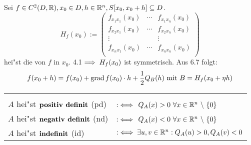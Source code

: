 \documentclass[a4paper,twoside,DIV15,BCOR12mm,chapterprefix=true,headings=twolinechapter]{scrbook}
\begin{document}
\begin{beispiel}
Sei $f\in C^2(D,\mathbb{R}),x_0\in D, h\in \mathbb{R}^n, S[x_0,x_0+h]\subseteq D$.
$$H_f(x_0):=\begin{pmatrix}
f_{x_1x_1}(x_0)&\cdots&f_{x_1x_n}(x_0)\\
f_{x_2x_1}(x_0)&\cdots&f_{x_2x_n}(x_0)\\
\vdots& &\vdots\\
f_{x_nx_1}(x_0)&\cdots&f_{x_nx_n}(x_0)\\
\end{pmatrix}$$
hei"st die  von $f$ in $x_0$. 4.1$\implies H_f(x_0)$ ist symmetrisch. Aus 6.7 folgt:
$$f(x_0+h)=f(x_0)+\mathop{\rm grad}\nolimits f(x_0)\cdot h + \frac{1}{2}Q_B(h)\text{ mit }B=H_f(x_0+\eta h)$$
\end{beispiel}
\begin{definition*}
\begin{tabular}{ll}
\\ %
\\
$A$ hei"st $\begriff{positiv definit}$ (pd) & $:\iff$ $Q_A(x)>0\ \forall x\in\MdR^n\ \backslash\ \{0\}$\\
$A$ hei"st $\begriff{negativ definit}$ (nd) & $:\iff$ $Q_A(x)<0\ \forall x\in\MdR^n\ \backslash\ \{0\}$\\
$A$ hei"st $\begriff{indefinit}$ (id) & $:\iff \exists u,v\in\mathbb{R}^n: Q_A(u)>0, Q_A(v)<0$
\end{tabular}
\end{definition*}
\end{document}
